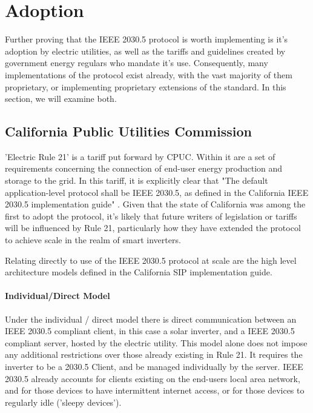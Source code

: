\chapter{Adoption}\label{ch:adoption}

Further proving that the IEEE 2030.5 protocol is worth implementing is it's adoption by electric utilities, as well as the tariffs and guidelines created by government energy regulars who mandate it's use.
Consequently, many implementations of the protocol exist already, with the vast majority of them proprietary, or implementing proprietary extensions of the standard.
In this section, we will examine both.

\section{California Public Utilities Commission}
'Electric Rule 21' is a tariff put forward by CPUC. Within it are a set of requirements concerning the connection of end-user energy production and storage to the grid. In this tariff, it is explicitly clear that
"The default application-level protocol shall be IEEE 2030.5, as defined in the California IEEE 2030.5 implementation guide" \cite[]{Rule21}.
Given that the state of California was among the first to adopt the protocol, it's likely that future writers of legislation or tariffs will be influenced by Rule 21, particularly how they have extended the protocol to achieve scale in the realm of smart inverters.

Relating directly to use of the IEEE 2030.5 protocol at scale are the high level architecture models defined in the California SIP implementation guide.

\subsubsection{Individual/Direct Model}
Under the individual / direct model there is direct communication between an IEEE 2030.5 compliant client, in this case a solar inverter, and a IEEE 2030.5 compliant server, hosted by the electric utility.
This model alone does not impose any additional restrictions over those already existing in Rule 21. It requires the inverter to be a 2030.5 Client, and be managed individually by the server. IEEE 2030.5 already accounts for clients existing on the end-users local area network, and for those devices to have intermittent internet access, or for those devices to regularly idle ('sleepy devices'). \cite{IEEE2030.5}

